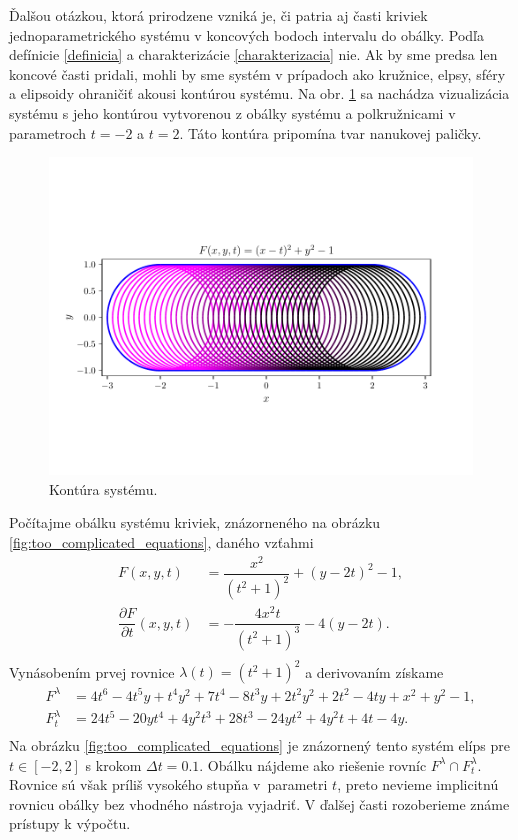 Ďalšou otázkou, ktorá prirodzene vzniká je, či patria aj časti kriviek jednoparametrického systému v koncových bodoch intervalu do obálky. Podľa defínicie \ref{definicia} a charakterizácie \ref{charakterizacia} nie. Ak by sme predsa len koncové časti pridali, mohli by sme systém v prípadoch ako kružnice, elpsy, sféry a elipsoidy ohraničiť akousi kontúrou systému. Na obr. \ref{fig:nanuk} sa nachádza vizualizácia systému s jeho kontúrou vytvorenou z obálky systému a polkružnicami v parametroch $t=-2$ a $t=2.$ Táto kontúra pripomína tvar nanukovej paličky.
\begin{figure}[h]
	\centering
	\includegraphics[trim={0.5cm 2.8cm 0.5cm 3.3cm},clip]{images/nanuk.pdf}
	\caption{Kontúra systému.}
	\label{fig:nanuk}
\end{figure}
\begin{example}
\label{example:too_complicated_equations}
Počítajme obálku systému kriviek, znázorneného na obrázku \ref{fig:too_complicated_equations}, daného vzťahmi
\begin{align*}
F(x,y, t) &= \dfrac{x^2}{(t^2 + 1)^2} + (y - 2t)^2 - 1, \\
\dfrac{\partial F}{\partial t}(x, y, t) &= -\dfrac{4x^2t}{\left(t^2+1\right)^3}-4\left(y-2t\right). \\
\end{align*}
Vynásobením prvej rovnice $ \lambda(t) = (t^2 + 1)^2$ a derivovaním získame
\begin{align*}
F^\lambda &= 4 t^6 - 4 t^5 y + t^4 y^2 + 7 t^4 - 8 t^3 y + 2 t^2 y^2 + 2 t^2 - 4 t y + x^2 + y^2 - 1, \\
F_t^\lambda &= 24t^5-20yt^4+4y^2t^3+28t^3-24yt^2+4y^2t+4t-4y. \\
\end{align*}
Na obrázku \ref{fig:too_complicated_equations} je znázornený tento systém elíps pre $t \in [-2,2]$ s krokom $\Delta t=0.1$. Obálku nájdeme ako riešenie rovníc $F^\lambda \cap F_t^\lambda. $ Rovnice sú však príliš vysokého stupňa v~parametri $t$, preto nevieme implicitnú rovnicu obálky bez vhodného nástroja vyjadriť. V ďalšej časti rozoberieme známe prístupy k výpočtu.
\end{example}
